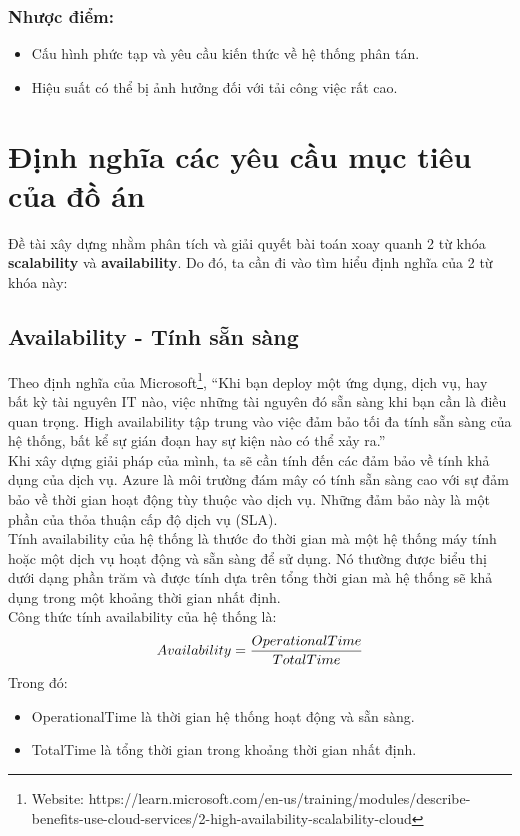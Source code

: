 \subsubsection{Nhược điểm:}
\begin{itemize}
    \item Cấu hình phức tạp và yêu cầu kiến thức về hệ thống phân tán.
    \item Hiệu suất có thể bị ảnh hưởng đối với tải công việc rất cao.
\end{itemize}
\section{Định nghĩa các yêu cầu mục tiêu của đồ án}
\noindent Đề tài xây dựng nhằm phân tích và giải quyết bài toán xoay quanh 2 từ khóa \textbf{scalability} và \textbf{availability}. Do đó, ta cần đi vào tìm hiểu định nghĩa của 2 từ khóa này:

\subsection{Availability - Tính sẵn sàng}
\noindent Theo định nghĩa của Microsoft\footnote{Website: https://learn.microsoft.com/en-us/training/modules/describe-benefits-use-cloud-services/2-high-availability-scalability-cloud}, “Khi bạn deploy một ứng dụng, dịch vụ, hay bất kỳ tài nguyên IT nào, việc những tài nguyên đó sẵn sàng khi bạn cần là điều quan trọng. High availability tập trung vào việc đảm bảo tối đa tính sẵn sàng của hệ thống, bất kể sự gián đoạn hay sự kiện nào có thể xảy ra.” \\[0.5cm]

\noindent Khi xây dựng giải pháp của mình, ta sẽ cần tính đến các đảm bảo về tính khả dụng của dịch vụ. Azure là môi trường đám mây có tính sẵn sàng cao với sự đảm bảo về thời gian hoạt động tùy thuộc vào dịch vụ. Những đảm bảo này là một phần của thỏa thuận cấp độ dịch vụ (SLA).\\[0.5cm]

\noindent Tính availability của hệ thống là thước đo thời gian mà một hệ thống máy tính hoặc một dịch vụ hoạt động và sẵn sàng để sử dụng. Nó thường được biểu thị dưới dạng phần trăm và được tính dựa trên tổng thời gian mà hệ thống sẽ khả dụng trong một khoảng thời gian nhất định.\\
\noindent Công thức tính availability của hệ thống là:\\
\begin{equation}
    Availability = \frac{Operational Time}{Total Time}\\
\end{equation}
\noindent Trong đó:
\begin{itemize}
    \item OperationalTime là thời gian hệ thống hoạt động và sẵn sàng.
    \item TotalTime là tổng thời gian trong khoảng thời gian nhất định.
\end{itemize}
